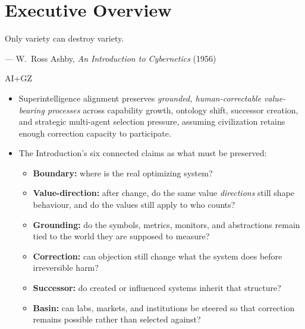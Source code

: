 \chapter*{Executive Overview}

\epigraph{%
Only variety can destroy variety.%
}{--- W.\ Ross Ashby, \emph{An Introduction to Cybernetics} (1956)}


\begin{authbar}{AI+GZ}
\begin{itemize}
  \item Superintelligence alignment preserves \emph{grounded, human-correctable value-bearing processes} across capability growth, ontology shift, successor creation, and strategic multi-agent selection pressure, assuming civilization retains enough correction capacity to participate.
  \item The Introduction's six connected claims as what must be preserved:
  \begin{itemize}
    \item \textbf{Boundary:} where is the real optimizing system?
    \item \textbf{Value-direction:} after change, do the same value \emph{directions} still shape behaviour, and do the values still apply to who counts?
    \item \textbf{Grounding:} do the symbols, metrics, monitors, and abstractions remain tied to the world they are supposed to measure?
    \item \textbf{Correction:} can objection still change what the system does before irreversible harm?
    \item \textbf{Successor:} do created or influenced systems inherit that structure?
    \item \textbf{Basin:} can labs, markets, and institutions be steered so that correction remains possible rather than selected against?
  \end{itemize}
\end{itemize}
\end{authbar}


